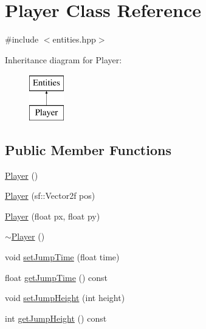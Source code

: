 \hypertarget{classPlayer}{\section{Player Class Reference}
\label{classPlayer}
}


{\ttfamily \#include $<$entities.\-hpp$>$}

Inheritance diagram for Player\-:\begin{figure}[H]
\begin{center}
\leavevmode
\includegraphics[height=2.000000cm]{classPlayer}
\end{center}
\end{figure}
\subsection*{Public Member Functions}
\begin{DoxyCompactItemize}
\item 
\hyperlink{classPlayer_affe0cc3cb714f6deb4e62f0c0d3f1fd8}{Player} ()
\item 
\hyperlink{classPlayer_a590f9fa9624d8734027fa2b290fa909e}{Player} (sf\-::\-Vector2f pos)
\item 
\hyperlink{classPlayer_ad2d6910c46e7fdf375870da47ae3db5f}{Player} (float px, float py)
\item 
\hyperlink{classPlayer_a749d2c00e1fe0f5c2746f7505a58c062}{$\sim$\-Player} ()
\item 
void \hyperlink{classPlayer_a01c63b9632f8a4f679f2e4cd704f14b9}{set\-Jump\-Time} (float time)
\item 
float \hyperlink{classPlayer_a9165dbc42a8d434d4eb0c64251305855}{get\-Jump\-Time} () const 
\item 
void \hyperlink{classPlayer_aa04cc1ac4ae2b43bfb841929e3d59315}{set\-Jump\-Height} (int height)
\item 
int \hyperlink{classPlayer_a41384c619c72d9cfd1ad6a354e917f8e}{get\-Jump\-Height} () const 
\end{DoxyCompactItemize}


